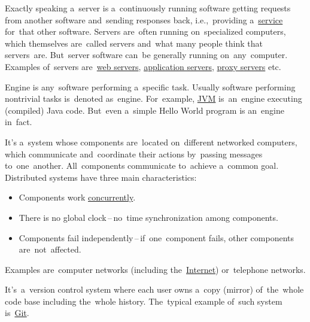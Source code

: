 \label{server}
Exactly speaking a~server is a~continuously running software getting requests from another software and~sending responses back, i.e.,~providing a~\hyperref[applicationprocessprogramservicethread]{service} for~that other software. Servers are~often running on~specialized computers, which themselves are~called servers and~what many people think that servers~are. But~server software can~be generally running on~any~computer.
Examples of~servers are~\hyperref[webserver]{web servers}, \hyperref[applicationserver]{application servers}, \hyperref[proxy]{proxy servers} etc.

\label{engine}
Engine is any~software performing a~specific task. Usually software performing nontrivial tasks is~denoted as~engine. For~example, \hyperref[jdkjrejvm]{JVM} is~an~engine executing (compiled) Java code. But~even a~simple Hello World program is an~engine in~fact.

\label{distributedsystem}
It's a~system whose components are~located on~different networked computers, which communicate and~coordinate their actions by~passing messages to~one~another. All~components communicate to~achieve a~common goal. Distributed systems have three main characteristics:
\begin{itemize}
    \item Components work \hyperref[concurrency]{concurrently}.
    \item There is no global clock\,--\,no~time synchronization among components.
    \item Components fail independently\,--\,if~one~component fails, other components are~not~affected.
\end{itemize}
\noindent Examples are~computer networks (including the~\hyperref[internetweb]{Internet}) or~telephone networks.

\label{distributedversioncontrolsystem}
It's~a~version control system where each user owns a~copy (mirror) of~the~whole code base including the~whole history. The~typical example of~such system is~\hyperref[git]{Git}.

\label{multitasking}

\label{concurrency}

\label{loosetightcoupling}

